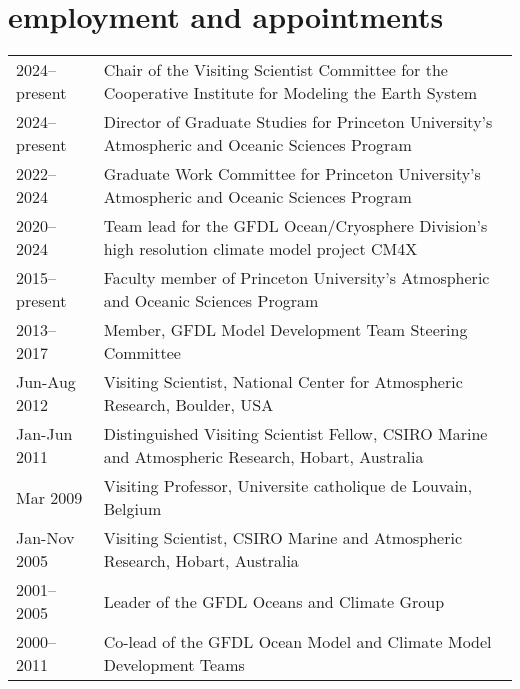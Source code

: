 \documentclass{article}
\begin{document}
\vspace{-.5cm}
\section*{\sc \color{Maroon} employment and appointments} 
\vspace{-.25cm}
\begin{tabular}{ll}
  2024--present & Chair of the Visiting Scientist  Committee for the Cooperative Institute for Modeling the Earth System 
  \\
  
   2024--present & Director of Graduate Studies for Princeton University's Atmospheric and Oceanic Sciences Program
  \\
  
  2022--2024 & Graduate Work Committee for Princeton University's Atmospheric and Oceanic Sciences Program
  \\
  
  2020--2024 & Team lead for the GFDL Ocean/Cryosphere Division's high resolution climate model project CM4X 
  \\

  2015--present & Faculty member of Princeton University's Atmospheric and Oceanic Sciences Program
  \\
 
  2013--2017  & Member, GFDL Model Development Team Steering Committee  \\
  
  Jun-Aug 2012  & Visiting Scientist, National Center for Atmospheric
                  Research, Boulder, USA \\

  Jan-Jun 2011   & Distinguished Visiting Scientist Fellow, CSIRO Marine and Atmospheric Research, Hobart, Australia \\
 
  Mar 2009         & Visiting Professor, Universite catholique de Louvain, Belgium \\
 
  Jan-Nov 2005   & Visiting Scientist, CSIRO Marine and Atmospheric  Research, Hobart, Australia \\
 
  2001--2005     & Leader of the GFDL Oceans and Climate Group \\
 
  2000--2011     & Co-lead of the GFDL Ocean Model and Climate Model Development Teams \\
  

\end{tabular}
\end{document}
